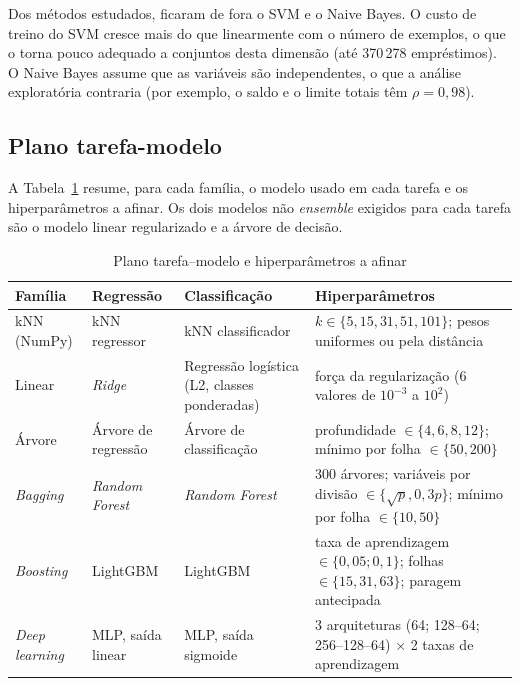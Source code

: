 Dos métodos estudados, ficaram de fora o SVM e o Naive Bayes. O custo de treino do SVM cresce mais do que linearmente com o número de exemplos, o que o torna pouco adequado a conjuntos desta dimensão (até 370\,278 empréstimos). O Naive Bayes assume que as variáveis são independentes, o que a análise exploratória contraria (por exemplo, o saldo e o limite totais têm $\rho = 0{,}98$).


\subsection{Plano tarefa-modelo}

A Tabela~\ref{tab:mod-plano} resume, para cada família, o modelo usado em cada tarefa e os hiperparâmetros a afinar. Os dois modelos não \textit{ensemble} exigidos para cada tarefa são o modelo linear regularizado e a árvore de decisão.

\begin{table}[t]
\caption{Plano tarefa--modelo e hiperparâmetros a afinar}
\label{tab:mod-plano}
\centering
\footnotesize
\begin{tabular}{|p{}|p{}|p{}|p{}|}
\hline
\textbf{Família} & \textbf{Regressão} & \textbf{Classificação} & \textbf{Hiperparâmetros} \\
\hline
kNN (NumPy) & kNN regressor & kNN classificador & $k \in \{5, 15, 31, 51, 101\}$; pesos uniformes ou pela distância \\
\hline
Linear & \textit{Ridge} & Regressão logística (L2, classes ponderadas) & força da regularização (6 valores de $10^{-3}$ a $10^{2}$) \\
\hline
Árvore & Árvore de regressão & Árvore de classificação & profundidade $\in \{4, 6, 8, 12\}$; mínimo por folha $\in \{50, 200\}$ \\
\hline
\textit{Bagging} & \textit{Random Forest} & \textit{Random Forest} & 300 árvores; variáveis por divisão $\in \{\sqrt{p}, 0{,}3p\}$; mínimo por folha $\in \{10, 50\}$ \\
\hline
\textit{Boosting} & LightGBM & LightGBM & taxa de aprendizagem $\in \{0{,}05; 0{,}1\}$; folhas $\in \{15, 31, 63\}$; paragem antecipada \\
\hline
\textit{Deep learning} & MLP, saída linear & MLP, saída sigmoide & 3 arquiteturas (64; 128--64; 256--128--64) $\times$ 2 taxas de aprendizagem \\
\hline
\end{tabular}
\end{table}


